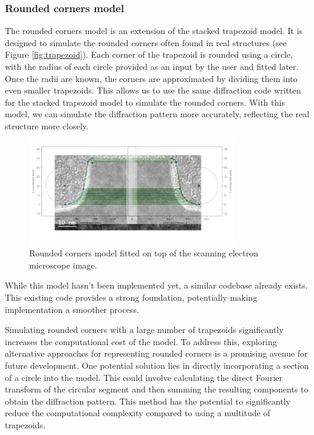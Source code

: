 \medskip

\subsubsection{Rounded corners model}

The rounded corners model is an extension of the stacked trapezoid model. It is designed to 
simulate the rounded corners often found in real structures (see Figure \ref{fig:trapezoid}). 
Each corner of the trapezoid is rounded using a circle, with the radius of each circle provided 
as an input by the user and fitted later. Once the radii are known, the corners are approximated 
by dividing them into even smaller trapezoids. This allows us to use the same diffraction code written for the
 stacked trapezoid model to simulate the rounded corners. With this model, we can simulate the 
 diffraction pattern more accurately, reflecting the real structure more closely.

\begin{figure}[h]
    \centering
    \includegraphics[width=0.8\textwidth]{images/rounded.PNG}
    \caption{Rounded corners model fitted on top of the scanning electron microscope image.}
    \label{fig:rounded_corners}
\end{figure}

\medskip

While this model hasn't been implemented yet, a similar codebase already exists. This existing
code provides a strong foundation, potentially making implementation a smoother process.

\medskip

Simulating rounded corners with a large number of trapezoids significantly increases the 
computational cost of the model. To address this, exploring alternative approaches for representing 
rounded corners is a promising avenue for future development. One potential solution lies in 
directly incorporating a section of a circle into the model. This could involve calculating the 
direct Fourier transform of the circular segment and then summing the resulting components to obtain the 
diffraction pattern. This method has the potential to significantly reduce the computational 
complexity compared to using a multitude of trapezoids.

